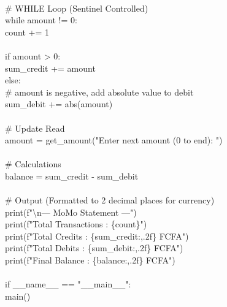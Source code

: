 \documentclass[11pt]{article}
\begin{document}
\begin{exoresolu}
\begin{flushleft}
\mbox{}\\
\hspace{1em}\# WHILE Loop (Sentinel Controlled)\\
\hspace{1em}while amount != 0:\\
\hspace{2em}count += 1\\
\mbox{}\\
\hspace{2em}if amount > 0:\\
\hspace{3em}sum\_credit += amount\\
\hspace{2em}else:\\
\hspace{3em}\# amount is negative, add absolute value to debit\\
\hspace{3em}sum\_debit += abs(amount)\\
\mbox{}\\
\hspace{2em}\# Update Read\\
\hspace{2em}amount = get\_amount("Enter next amount (0 to end): ")\\
\mbox{}\\
\hspace{1em}\# Calculations\\
\hspace{1em}balance = sum\_credit - sum\_debit\\
\mbox{}\\
\hspace{1em}\# Output (Formatted to 2 decimal places for currency)\\
\hspace{1em}print(f"\textbackslash n--- MoMo Statement ---")\\
\hspace{1em}print(f"Total Transactions : \{count\}")\\
\hspace{1em}print(f"Total Credits      : \{sum\_credit:,.2f\} FCFA")\\
\hspace{1em}print(f"Total Debits       : \{sum\_debit:,.2f\} FCFA")\\
\hspace{1em}print(f"Final Balance      : \{balance:,.2f\} FCFA")\\
\mbox{}\\
if \_\_name\_\_ == "\_\_main\_\_":\\
\hspace{1em}main()
\end{flushleft}


\end{exoresolu}
\end{document}

